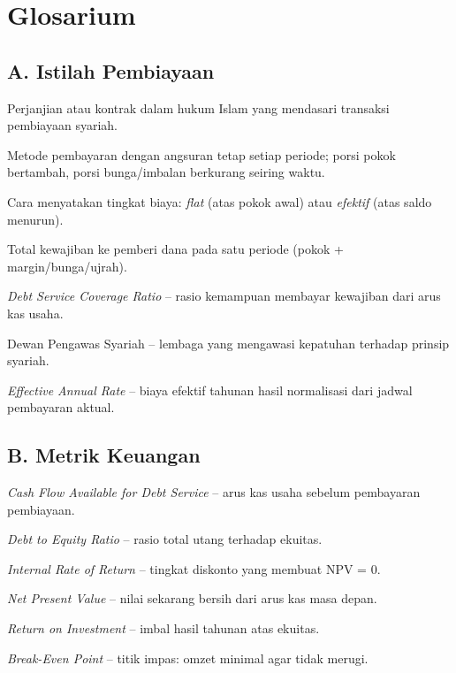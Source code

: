 \documentclass[12pt,a4paper,twoside]{report}
\begin{document}
\chapter{Glosarium}

\section*{A. Istilah Pembiayaan}

\begin{description}[style=unboxed,leftmargin=2.5cm]
  \item[Akad] Perjanjian atau kontrak dalam hukum Islam yang mendasari transaksi pembiayaan syariah.
  \item[Anuitas] Metode pembayaran dengan angsuran tetap setiap periode; porsi pokok bertambah, porsi bunga/imbalan berkurang seiring waktu.
  \item[Basis kuotasi] Cara menyatakan tingkat biaya: \emph{flat} (atas pokok awal) atau \emph{efektif} (atas saldo menurun).
  \item[Debt service] Total kewajiban ke pemberi dana pada satu periode (pokok + margin/bunga/ujrah).
  \item[DSCR] \emph{Debt Service Coverage Ratio} -- rasio kemampuan membayar kewajiban dari arus kas usaha.
  \item[DPS] Dewan Pengawas Syariah -- lembaga yang mengawasi kepatuhan terhadap prinsip syariah.
  \item[EAR] \emph{Effective Annual Rate} -- biaya efektif tahunan hasil normalisasi dari jadwal pembayaran aktual.
\end{description}

\section*{B. Metrik Keuangan}

\begin{description}[style=unboxed,leftmargin=2.5cm]
  \item[CFADS] \emph{Cash Flow Available for Debt Service} -- arus kas usaha sebelum pembayaran pembiayaan.
  \item[DER] \emph{Debt to Equity Ratio} -- rasio total utang terhadap ekuitas.
  \item[IRR] \emph{Internal Rate of Return} -- tingkat diskonto yang membuat NPV = 0.
  \item[NPV] \emph{Net Present Value} -- nilai sekarang bersih dari arus kas masa depan.
  \item[ROI] \emph{Return on Investment} -- imbal hasil tahunan atas ekuitas.
  \item[BEP] \emph{Break-Even Point} -- titik impas: omzet minimal agar tidak merugi.
\end{description}
\end{document}
